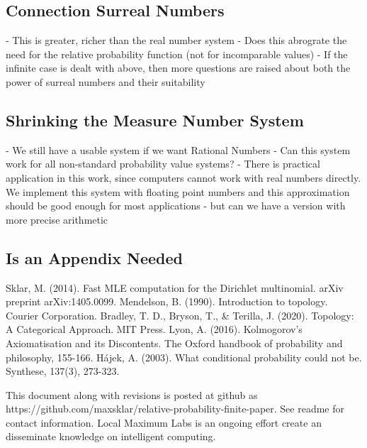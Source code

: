 \documentclass[twoside]{article}
\begin{document}
\subsection{Connection Surreal Numbers}
- This is greater, richer than the real number system
- Does this abrograte the need for the relative probability function (not for incomparable values)
- If the infinite case is dealt with above, then more questions are raised about both the power of surreal numbers and their suitability
\subsection{Shrinking the Measure Number System}
- We still have a usable system if we want Rational Numbers
- Can this system work for all non-standard probability value systems?
- There is practical application in this work, since computers cannot work with real numbers directly. We implement this system with floating point numbers and this approximation should be good enough for most applications - but can we have a version with more precise arithmetic

\begin{appendices}

\section{Is an Appendix Needed}

\end{appendices}


\begin{thebibliography}{20}

Sklar, M. (2014). Fast MLE computation for the Dirichlet multinomial. arXiv preprint arXiv:1405.0099.
Mendelson, B. (1990). Introduction to topology. Courier Corporation.
Bradley, T. D., Bryson, T., \& Terilla, J. (2020). Topology: A Categorical Approach. MIT Press.
Lyon, A. (2016). Kolmogorov’s Axiomatisation and its Discontents. The Oxford handbook of probability and philosophy, 155-166.
Hájek, A. (2003). What conditional probability could not be. Synthese, 137(3), 273-323.

\end{thebibliography}

This document along with revisions is posted at github as https://github.com/maxsklar/relative-probability-finite-paper. See readme for contact information. Local Maximum Labs is an ongoing effort create an disseminate knowledge on intelligent computing.
\end{document}
